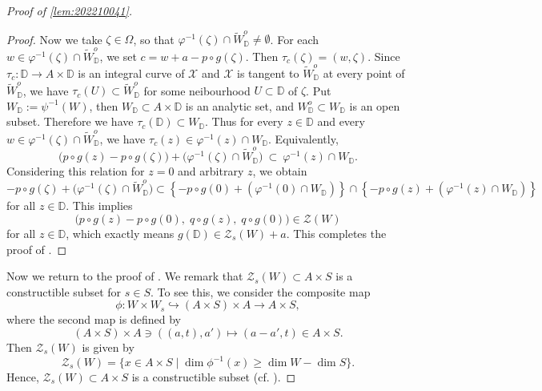 \documentclass[11pt,english]{smfart}
\theoremstyle{plain}
\theoremstyle{definition}
\theoremstyle{remark}
\numberwithin{equation}{section}
\theoremstyle{plain}
\begin{document}
\begin{proof}[Proof of \cref{lem:202210041}]
\begin{proof}
Now we take $\zeta\in \Omega$, so that $\varphi^{-1}(\zeta)\cap\widetilde W^o_{\mathbb D}\not=\emptyset$.
For each $w\in \varphi^{-1}(\zeta)\cap\widetilde W^o_{\mathbb D}$, we set $c=w+a-p\circ g(\zeta)$.
Then $\tau_c(\zeta)=(w,\zeta)$.
Since $\tau_c:\mathbb D\to A\times\mathbb D$ is an integral curve of $\mathcal{X}$ and $\mathcal{X}$ is tangent
to $\widetilde W^o_{\mathbb D}$ at every point of $\widetilde W^o_{\mathbb D}$, we have $\tau_c(U)\subset \widetilde W^o_{\mathbb D}$ for some neibourhood $U\subset \mathbb D$ of $\zeta$.
Put $W_{\mathbb D}:=\psi^{-1}(W)$, then $W_{\mathbb D}\subset A\times \mathbb D$ is an analytic set, and $W^o_{\mathbb D}\subset W_{\mathbb D}$ is an open subset.
Therefore we have $\tau_c(\mathbb D)\subset W_{\mathbb D}$. 
Thus for every $z\in \mathbb D$ and every $w\in \varphi^{-1}(\zeta)\cap\widetilde W^o_{\mathbb D}$, we have
$\tau_c(z)\in \varphi^{-1}(z)\cap W_{\mathbb D}$. 
Equivalently,
\[
\bigl(p\circ g(z)-p\circ g(\zeta)\bigr) + \bigl(\varphi^{-1}(\zeta)\cap\widetilde W^o_{\mathbb D}\bigr)
\ \subset\ \varphi^{-1}(z)\cap W_{\mathbb D}.
\]
Considering this relation for $z=0$ and arbitrary $z$, we obtain
$$
-p\circ g(\zeta) + \bigl(\varphi^{-1}(\zeta)\cap\widetilde W^o_{\mathbb D}\bigr)
\subset\left\{-p\circ g(0)+(\varphi^{-1}(0)\cap W_{\mathbb D})\right\}\cap \left\{-p\circ g(z)+(\varphi^{-1}(z)\cap W_{\mathbb D})\right\}
$$
for all $z\in \mathbb D$.
This implies
\[
\bigl(p\circ g(z)-p\circ g(0),\; q\circ g(z),\; q\circ g(0)\bigr)\in \mathcal{Z}(W)
\]
for all $z\in \mathbb D$, which exactly means $g(\mathbb D)\in\mathcal{Z}_{s}(W)+a$. 
This completes the proof of .
		\end{proof}
	
	
	Now we return to the proof of .
	We remark that $\mathcal{Z}_s(W)\subset A\times S$ is a constructible subset for $s\in S$.
		To see this, we consider the composite map 
$$\phi : W \times W_s \hookrightarrow (A \times S) \times A\to A \times S,$$ 
where the second map is defined by 
\[
(A \times S) \times A  \ni ((a, t), a') \mapsto (a - a', t) \in A \times S.
\]
Then $\mathcal{Z}_s(W)$ is given by
\begin{equation*}
\mathcal{Z}_s(W) = \{x \in A \times S  \mid \dim \phi^{-1}(x) \geq \dim W - \dim S\}.
\end{equation*}
Hence, $\mathcal{Z}_s(W)\subset A\times S$ is a constructible subset (cf. \cite[Tag 05F9]{stacks-project}).
		
		
		

\end{proof}
\end{document}
